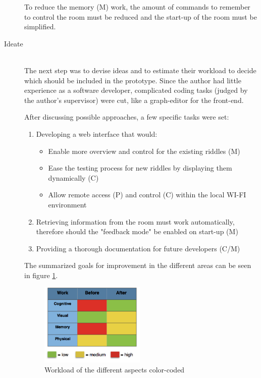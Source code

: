\begin{description}
	To reduce the memory (M) work, the amount of commands to remember to control the room must be reduced and the start-up of the room must be simplified.

	\item [Ideate]\hfill \\
	The next step was to devise ideas and to estimate their workload to decide 
	which should be included in the prototype. Since the author had little experience as a software developer,
	complicated coding tasks (judged by the author's supervisor) were cut, 
	like a graph-editor for the front-end.

	After discussing possible approaches, a few specific tasks were set:
	      \begin{enumerate}
		      \item Developing a web interface that would:
		            \begin{itemize}
			            \item Enable more overview and control for the existing riddles (M)
			            \item Ease the testing process for new riddles by displaying them dynamically (C)
			            \item Allow remote access (P) and control (C) within the local WI-FI environment
		            \end{itemize}
		      \item Retrieving information from the room must work automatically, therefore should the "feedback mode" be enabled on start-up (M)
		      \item Providing a thorough documentation for future developers  (C/M)
	      \end{enumerate}

	      The summarized goals for improvement in the different areas can be seen in figure \ref{fig:workload}.

	      \begin{figure}[th]
		      \centering
		      \includegraphics[width=50mm,scale=.5]{Figures/workload}
		      \decoRule
		      \caption[workload]{Workload of the different aspects color-coded}
		      \label{fig:workload}
	      \end{figure}


\end{description}
